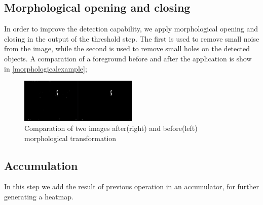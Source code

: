 \documentclass[10pt, conference]{IEEEtran}
\begin{document}
	\subsection{Morphological opening and closing}
	In order to improve the detection capability, we apply morphological opening and closing\cite{haralick1987image} in the output of the threshold step. The first is used to remove small noise from the image, while the second is used to remove small holes on the detected objects. A comparation of a foreground before and after the application is show in \autoref{morphologicalexample};
	\begin{figure}[H]
		\centering
		\includegraphics[width=0.5\textwidth]{figs/morphological}
		\caption{Comparation of two images after(right) and before(left) morphological transformation}
		\label{morphologicalexample}
	\end{figure}
	
	\subsection{Accumulation}
	In this step we add the result of previous operation in an accumulator, for further generating a heatmap.
	
\end{document}

